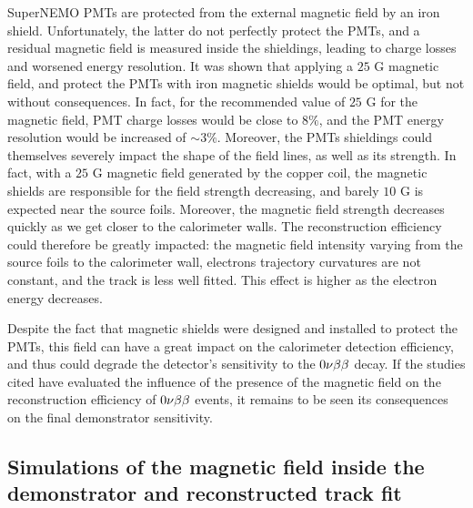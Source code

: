 SuperNEMO PMTs are protected from the external magnetic field by an iron shield.
Unfortunately, the latter do not perfectly protect the PMTs, and a residual magnetic field is measured inside the shieldings, leading to charge losses and worsened energy resolution.
It was shown that applying a $25$ G magnetic field, and protect the PMTs with iron magnetic shields would be optimal, but not without consequences.
In fact, for the recommended value of $25$ G for the magnetic field, PMT charge losses would be close to $8\%$, and the PMT energy resolution would be increased of $\sim 3\%$.
Moreover, the PMTs shieldings could themselves severely impact the shape of the field lines, as well as its strength.
In fact, with a $25$ G magnetic field generated by the copper coil, the magnetic shields are responsible for the field strength decreasing, and barely $10$ G is expected near the source foils.
Moreover, the magnetic field strength decreases quickly as we get closer to the calorimeter walls.
The reconstruction efficiency could therefore be greatly impacted:
the magnetic field intensity varying from the source foils to the calorimeter wall, electrons trajectory curvatures are not constant, and the track is less well fitted.
This effect is higher as the electron energy decreases.

Despite the fact that magnetic shields were designed and installed to protect the PMTs, this field can have a great impact on the calorimeter detection efficiency, and thus could degrade the detector's sensitivity to the $0\nu\beta\beta$ decay.
If the studies cited have evaluated the influence of the presence of the magnetic field on the reconstruction efficiency of $0\nu\beta\beta$ events, it remains to be seen its consequences on the final demonstrator sensitivity.

\subsection{Simulations of the magnetic field inside the demonstrator and reconstructed track fit}

